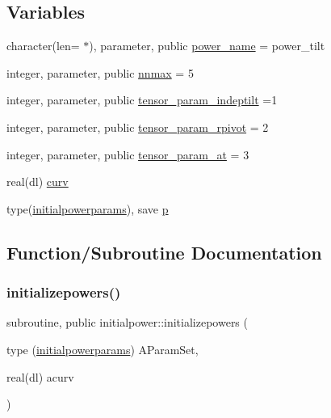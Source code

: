 \subsection*{Variables}
\begin{DoxyCompactItemize}
\item 
character(len= $\ast$), parameter, public \mbox{\hyperlink{namespaceinitialpower_a5397e53840b8c5aa10ab09fcd8cb23b4}{power\+\_\+name}} = \textquotesingle{}power\+\_\+tilt\textquotesingle{}
\item 
integer, parameter, public \mbox{\hyperlink{namespaceinitialpower_a9749c023ff83f7ffa2677dc578379c10}{nnmax}} = 5
\item 
integer, parameter, public \mbox{\hyperlink{namespaceinitialpower_a08c3c750bc5c8657967d99b3f0b9585e}{tensor\+\_\+param\+\_\+indeptilt}} =1
\item 
integer, parameter, public \mbox{\hyperlink{namespaceinitialpower_a610fa4412cca71c3692bd468cd0df5ec}{tensor\+\_\+param\+\_\+rpivot}} = 2
\item 
integer, parameter, public \mbox{\hyperlink{namespaceinitialpower_a1ab75aba3a08150a1e0c54913880e1be}{tensor\+\_\+param\+\_\+at}} = 3
\item 
real(dl) \mbox{\hyperlink{namespaceinitialpower_a3a06e0904c8fdd21de5ce19490bb177b}{curv}}
\item 
type(\mbox{\hyperlink{structinitialpower_1_1initialpowerparams}{initialpowerparams}}), save \mbox{\hyperlink{namespaceinitialpower_ace8ec05c677782ea3843bc3e85b6f42d}{p}}
\end{DoxyCompactItemize}


\subsection{Function/\+Subroutine Documentation}
\mbox{\label{namespaceinitialpower_aa7485ddfdf405ed8912c8070fef8af62}} 
\subsubsection{\texorpdfstring{initializepowers()}{initializepowers()}}
{\footnotesize\ttfamily subroutine, public initialpower\+::initializepowers (\begin{DoxyParamCaption}\item[{type (\mbox{\hyperlink{structinitialpower_1_1initialpowerparams}{initialpowerparams}})}]{A\+Param\+Set,  }\item[{real(dl)}]{acurv }\end{DoxyParamCaption})}




